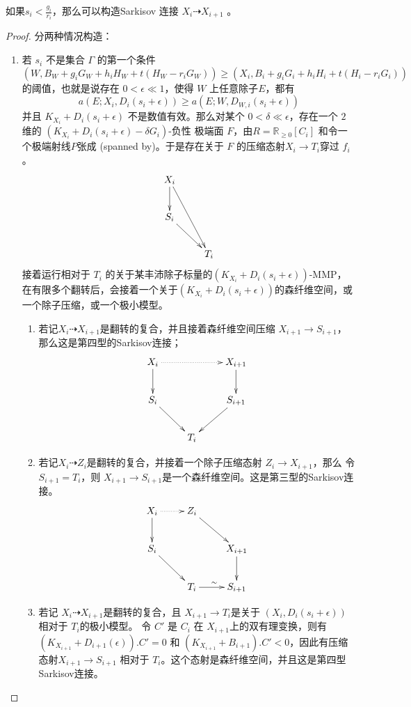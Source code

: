 \begin{proposition}[构造Sarkisov 连接]\label{2Constructlink}
 如果$s_{i}<\frac{g_{i}}{r_{i}}$，那么可以构造Sarkisov 连接 $X_{i}\dashrightarrow X_{i+1}$ 。
\end{proposition}
\begin{proof}
  分两种情况构造：
  \begin{enumerate}
  \item 若 $s_{i}$ 不是集合 $\Gamma$ 的第一个条件
    \[\left(W,B_{W}+g_{i}G_{W}+h_{i}H_{W}+t(H_{W}-r_{i}G_{W})\right)\geqslant \left(X_{i},B_{i}+g_{i}G_{i}+h_{i}H_{i}+t\left(H_{i}-r_{i}G_{i}\right)\right)\]
    的阈值，也就是说存在 $0<\epsilon\ll 1$，使得 $W$ 上任意除子$E$，都有
  \[ a(E;X_{i},D_{i}(s_{i}+\epsilon))\geqslant a(E;W,D_{W,i}(s_{i}+\epsilon)) \]
  并且 $K_{X_{i}}+D_{i}(s_{i}+\epsilon)$ 不是数值有效。那么对某个 $0< \delta \ll \epsilon $，存在一个 $2$ 维的 $(K_{X_{i}}+D_{i}(s_{i}+\epsilon)-\delta G_{i})$-负性 极端面 $F$，由$R=\mathbb{R}_{\geqslant 0}[C_{i}]$ 和令一个极端射线$P$张成 (spanned by)。于是存在关于 $F$   的压缩态射$X_{i}\to T_{i}$穿过 $f_{i}$。 
  \[
    \xymatrix{
      X_{i}\ar[d]\ar[rdd]& \\
      S_{i}\ar[rd]&\\
         &T_{i}
    }
  \]
  接着运行相对于 $T_{i}$ 的关于某丰沛除子标量的$(K_{X_{i}}+D_{i}(s_{i}+\epsilon))$-MMP，在有限多个翻转后，会接着一个关于$(K_{X_{i}}+D_{i}(s_{i}+\epsilon))$的森纤维空间，或一个除子压缩，或一个极小模型。
  \begin{enumerate}
    \item  若记$X_{i}\dashrightarrow X_{i+1}$是翻转的复合，并且接着森纤维空间压缩 $X_{i+1}\to S_{i+1}$，那么这是第四型的Sarkisov连接；
      \[
        \xymatrix{
          X_{i}\ar@{.>}[rr]\ar[d]& &X_{i+1}\ar[d] \\
          S_{i}\ar[rd]& & S_{i+1}\ar[ld]\\
             &T_{i}&
        }
      \]
    \item 若记$X_{i}\dashrightarrow Z_{i}$是翻转的复合，并接着一个除子压缩态射 $Z_{i}\to X_{i+1}$，那么 令 $S_{i+1}=T_{i}$，则 $X_{i+1}\to S_{i+1}$是一个森纤维空间。这是第三型的Sarkisov连接。
      \[
        \xymatrix{
          X_{i}\ar@{.>}[r]\ar[d]& Z_{i}\ar[rd] \\
          S_{i}\ar[rd]& & X_{i+1}\ar[d]\\
               &T_{i}\ar[r]^{\sim}& S_{i+1}
        }
      \]
    \item 若记 $X_{i}\dashrightarrow X_{i+1}$是翻转的复合，且 $X_{i+1}\to T_{i}$是关于 $\left(X_{i},D_{i}\left(s_{i}+\epsilon\right)\right)$ 相对于 $T_{i}$的极小模型。 令  $C'$ 是  $C_{i}$ 在 $X_{i+1}$上的双有理变换，则有 $(K_{X_{i+1}}+D_{i+1}(\epsilon)).C'=0$ 和 $(K_{X_{i+1}}+B_{i+1}).C'<0$，因此有压缩态射$X_{i+1} \to S_{i+1}$ 相对于 $T_i$。这个态射是森纤维空间，并且这是第四型Sarkisov连接。

\end{enumerate}
\end{enumerate}
\end{proof}
